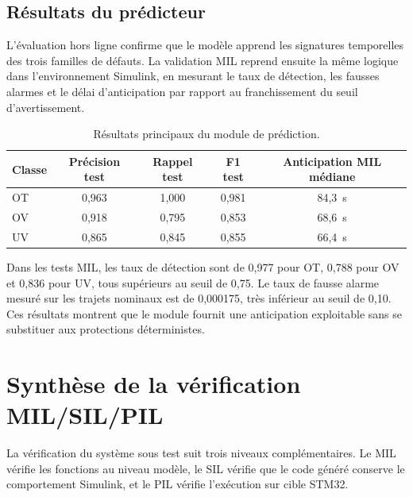 \subsection{Résultats du prédicteur}
\label{subsec:ch4_resultats_prediction}

L'évaluation hors ligne confirme que le modèle apprend les signatures temporelles des trois familles de défauts. La validation MIL reprend ensuite la même logique dans l'environnement Simulink, en mesurant le taux de détection, les fausses alarmes et le délai d'anticipation par rapport au franchissement du seuil d'avertissement.

\begin{table}[H]
  \centering
  \small
  \begin{tabular}{|l|c|c|c|c|}
    \hline
    \textbf{Classe} & \textbf{Précision test} & \textbf{Rappel test} & \textbf{F1 test} & \textbf{Anticipation MIL médiane} \\
    \hline
    OT & 0{,}963 & 1{,}000 & 0{,}981 & 84{,}3~s \\
    \hline
    OV & 0{,}918 & 0{,}795 & 0{,}853 & 68{,}6~s \\
    \hline
    UV & 0{,}865 & 0{,}845 & 0{,}855 & 66{,}4~s \\
    \hline
  \end{tabular}
  \captionsetup{width=0.82\textwidth, skip=15pt}
  \caption{Résultats principaux du module de prédiction.}
  \label{tab:ch4_synthese_prediction}
\end{table}

\noindent
Dans les tests MIL, les taux de détection sont de 0{,}977 pour OT, 0{,}788 pour OV et 0{,}836 pour UV, tous supérieurs au seuil de 0{,}75. Le taux de fausse alarme mesuré sur les trajets nominaux est de 0{,}000175, très inférieur au seuil de 0{,}10. Ces résultats montrent que le module fournit une anticipation exploitable sans se substituer aux protections déterministes.

\section{Synthèse de la vérification MIL/SIL/PIL}
\label{sec:ch4_verification}

La vérification du système sous test suit trois niveaux complémentaires. Le MIL vérifie les fonctions au niveau modèle, le SIL vérifie que le code généré conserve le comportement Simulink, et le PIL vérifie l'exécution sur cible STM32.

